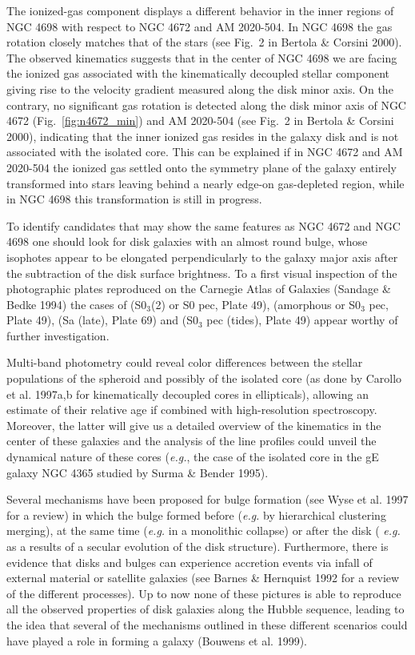 \documentclass[twocolumns]{aa}
\begin{document}
The ionized-gas component displays a different behavior in the inner
regions of NGC 4698 with respect to NGC 4672 and AM 2020-504.  In NGC
4698 the gas rotation closely matches that of the stars (see Fig.~2 in
Bertola \& Corsini 2000). The observed kinematics suggests that in the
center of NGC 4698 we are facing the ionized gas associated with the
kinematically decoupled stellar component giving rise to the velocity
gradient measured along the disk minor axis.  On the contrary, no
significant gas rotation is detected along the disk minor axis of NGC
4672 (Fig.~\ref{fig:n4672_min}) and AM 2020-504 (see Fig.~2 in
Bertola \& Corsini 2000), indicating that the inner ionized gas
resides in the galaxy disk and is not associated with the isolated
core.  This can be explained if in NGC 4672 and AM 2020-504 the
ionized gas settled onto the symmetry plane of the galaxy entirely
transformed into stars leaving behind a nearly edge-on gas-depleted
region, while in NGC 4698 this transformation is still in progress.

\bigskip

To identify candidates that may show the same features as
NGC 4672 and NGC 4698 one should look for disk galaxies with an
almost round bulge, whose isophotes appear to be elongated
perpendicularly to the galaxy major axis after the subtraction of the
disk surface brightness.  To a first visual inspection of the
photographic plates reproduced on the Carnegie Atlas of Galaxies
(Sandage \& Bedke 1994) the cases of  (S0$_3$(2) or
S0 pec, Plate 49),  (amorphous or S0$_3$ pec, Plate
49),  (Sa (late), Plate 69) and 
(S0$_3$ pec (tides), Plate 49) appear worthy of further
investigation.

Multi-band photometry could reveal color differences between the
stellar populations of the spheroid and possibly of the isolated core
(as done by Carollo et al. 1997a,b for kinematically decoupled
cores in ellipticals), allowing an estimate of their relative
age if combined with high-resolution spectroscopy. Moreover, the
latter will give us a detailed overview of the kinematics in the
center of these galaxies and the analysis of the line profiles could
unveil the dynamical nature of these cores ({\it e.g.\/}, the case of
the isolated core in the gE galaxy NGC 4365 studied by Surma \& Bender
1995).

\bigskip

Several mechanisms have been proposed for bulge formation (see Wyse et al.
1997 for a review) in which the bulge formed before
({\it e.g.\/} by hierarchical clustering merging), at the same time
({\it e.g.\/} in a monolithic collapse) or after the disk ({\it
e.g.\/} as a results of a secular evolution of the disk structure).
Furthermore, there is evidence that disks and bulges can experience
accretion events via infall of external material or satellite galaxies
(see Barnes \& Hernquist 1992 for a review of the different
processes). Up to now none of these pictures is able to reproduce
all the observed properties of disk galaxies along the Hubble
sequence, leading to the idea that several of the mechanisms outlined in
these different scenarios could have played a role in forming a galaxy
(Bouwens et al. 1999).
\end{document}
